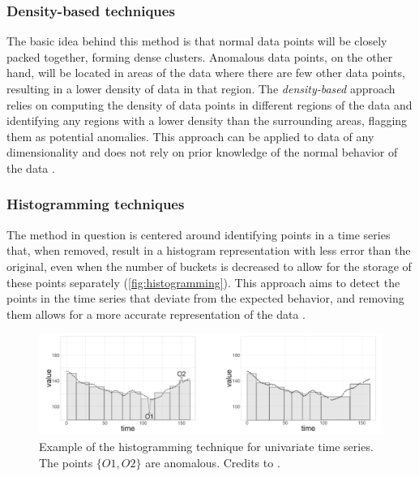 \subsubsection{Density-based techniques}
The basic idea behind this method is that normal data points will be closely packed together, forming dense clusters. Anomalous data points, on the other hand, will be located in areas of the data where there are few other data points, resulting in a lower density of data in that region. The \textit{density-based} approach relies on computing the density of data points in different regions of the data and identifying any regions with a lower density than the surrounding areas, flagging them as potential anomalies. This approach can be applied to data of any dimensionality and does not rely on prior knowledge of the normal behavior of the data \cite{blazquez2020review}.


\subsubsection{Histogramming techniques}
The method in question is centered around identifying points in a time series that, when removed, result in a histogram representation with less error than the original, even when the number of buckets is decreased to allow for the storage of these points separately (\autoref{fig:histogramming}). This approach aims to detect the points in the time series that deviate from the expected behavior, and removing them allows for a more accurate representation of the data \cite{blazquez2020review}.
\begin{figure}[t]
\centering
\includegraphics[width=1\linewidth]{figures/introduction-2/histogramming.png}
\caption{Example of the histogramming technique for univariate time series. The points $\{O1, O2\}$ are anomalous. Credits to \cite{blazquez2020review}.}
\label{fig:histogramming}
\end{figure}

